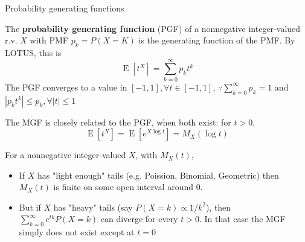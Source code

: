 \documentclass[8pt]{beamer}
\newcommand{\tb}[1]{\textbf{#1}}
\newcommand{\abs}[1]{\left\lvert #1 \right\rvert}
\newcommand{\expec}[1]{\operatorname{E}\left[ #1 \right]}
\begin{document}
\begin{frame}{Probability generating functions}
    \begin{definition}
        The \tb{probability generating function} (PGF) of a nonnegative integer-valued r.v. $X$ with PMF $p_k = P(X=K)$ is the generating function of the PMF. By LOTUS, this is
        \[
        \expec{t^X} = \sum_{k=0}^\infty p_k t^k
        \]
        The PGF converges to a value in $[-1, 1], \forall t \in [-1, 1]$, $\because \sum_{k=0}^\infty p_k = 1$ and $\abs{p_k t^k} \leq p_k, \forall \abs{t}\leq 1$

        The MGF is closely related to the PGF, when both exist: for $t > 0$,
        \[
        \expec{t^X} = \expec{e^{X \log{t}}} = M_X(\log{t})
        \]
    \end{definition}

    For a nonnegative integer-valued $X$, with $M_X(t)$,
    \begin{itemize}
        \item If $X$ has "light enough" tails (e.g. Poission, Binomial, Geometric) then $M_X(t)$ is finite on some open interval around $0$.
        \item But if $X$ has "heavy" tails (say $P(X = k) \propto 1/ k^2$), then $\sum_{k=0}^\infty e^{tk} P(X=k)$ can diverge for every $t>0$. In that case the MGF simply does not exist except at $t=0$
    \end{itemize}
\end{frame}
\end{document}
